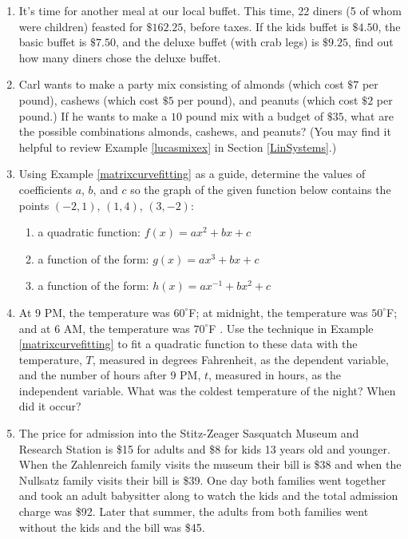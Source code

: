 \begin{enumerate}
\setcounter{enumi}{\value{HW}}

\item  It's time for another meal at our local buffet.  This time, 22 diners (5 of whom were children) feasted for $\$162.25$, before taxes.  If the kids buffet is $\$4.50$, the basic buffet is $\$7.50$, and the deluxe buffet (with crab legs) is $\$9.25$, find out how many diners chose the deluxe buffet. 

\item Carl wants to make a party mix consisting of almonds (which cost $\$7$ per pound), cashews (which cost $\$5$ per pound), and peanuts (which cost $\$2$ per pound.)  If he wants to make a $10$ pound mix with a budget of $\$35$, what are the possible combinations almonds, cashews, and peanuts?  (You may find it helpful to review Example \ref{lucasmixex} in Section \ref{LinSystems}.)


\item  \label{threepointsmatrixfunctionfitex}Using Example \ref{matrixcurvefitting} as a guide,  determine the values of coefficients $a$, $b$, and $c$ so the graph of the given function below contains the points $(-2,1)$, $(1,4)$, $(3,-2)$:

\begin{enumerate}

\item a quadratic function: $f(x) = ax^2+bx+c$

\item  a function of the form: $g(x) = ax^3+bx+c$ 

\item a function of the form:  $h(x) = ax^{-1}+bx^2+c$

\end{enumerate}


\item  At 9 PM, the temperature was $60^{\circ}$F; at midnight, the temperature was $50^{\circ}$F; and at 6 AM, the temperature was $70^{\circ}$F .  Use the technique in Example \ref{matrixcurvefitting} to fit a quadratic function to these data with the temperature, $T$, measured in degrees Fahrenheit, as the dependent variable, and the number of hours after 9 PM, $t$, measured in hours, as the independent variable. What was the coldest temperature of the night?  When did it occur? 

\item The price for admission into the Stitz-Zeager Sasquatch Museum and Research Station is \$15 for adults and \$8 for kids 13 years old and younger. When the Zahlenreich family visits the museum their bill is \$38 and when the Nullsatz family visits their bill is \$39.  One day both families went together and took an adult babysitter along to watch the kids and the total admission charge was \$92.  Later that summer, the adults from both families went without the kids and the bill was \$45.  


\end{enumerate}
